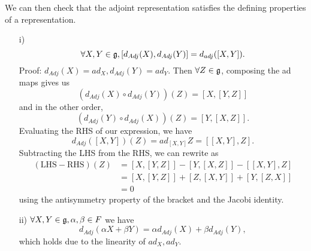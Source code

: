 We can then check that the adjoint representation satisfies the defining properties of a representation.
\begin{enumerate}
    \item[i)] $$\forall X, Y\in \mathfrak{g}, [d_{Adj}(X),d_{Adj}(Y)]=d_{adj}([X,Y]).$$
    Proof: $d_{Adj}(X)=ad_X,d_{Adj}(Y)=ad_Y.$
    Then $\forall Z\in \mathfrak{g}$, composing the ad maps gives us
    $$(d_{Adj}(X) \circ d_{Adj}(Y))(Z)=[X,[Y,Z]]$$
    and in the other order,
    $$(d_{Adj}(Y) \circ d_{Adj}(X))(Z)=[Y,[X,Z]].$$
    Evaluating the RHS of our expression, we have
    $$d_{Adj}([X,Y])(Z)=ad_{[X,Y]}Z=[[X,Y],Z].$$
    Subtracting the LHS from the RHS, we can rewrite as
    \begin{align*}
        (\text{LHS}-\text{RHS})(Z) &= [X,[Y,Z]]-[Y,[X,Z]]-[[X,Y],Z]\\
            &= [X,[Y,Z]]+[Z,[X,Y]]+[Y,[Z,X]]\\
            &= 0
    \end{align*}
    using the antisymmetry property of the bracket and the Jacobi identity.
    \item[ii)] $\forall X,Y\in \mathfrak{g}, \alpha,\beta\in F$ we have
    $$d_{Adj}(\alpha X+\beta Y)=\alpha d_{Adj}(X)+\beta d_{Adj}(Y),$$
    which holds due to the linearity of $ad_X, ad_Y.$
\end{enumerate}